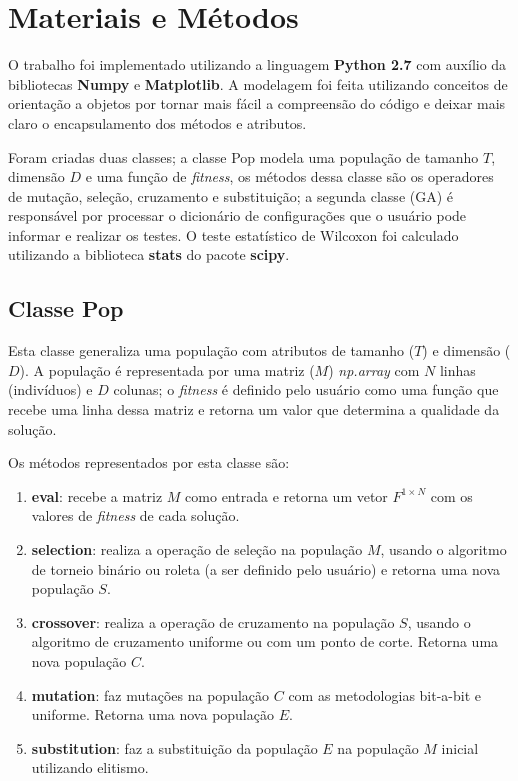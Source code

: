 \documentclass[11pt,a4paper]{article}
\begin{document}
\section{Materiais e Métodos}
O trabalho foi implementado utilizando a linguagem \textbf{Python 2.7} com auxílio da bibliotecas \textbf{Numpy} e \textbf{Matplotlib}. A modelagem foi feita utilizando conceitos de orientação a objetos por tornar mais fácil a compreensão do código e deixar mais claro o encapsulamento dos métodos e atributos.

Foram criadas duas classes; a classe Pop modela uma população de tamanho $T$, dimensão $D$ e uma função de \textit{fitness}, os métodos dessa classe são os operadores de mutação, seleção, cruzamento e substituição; a segunda classe (GA) é responsável por processar o dicionário de configurações que o usuário pode informar e realizar os testes. O teste estatístico de Wilcoxon foi calculado utilizando a biblioteca \textbf{stats} do pacote \textbf{scipy}.

\subsection{Classe Pop}
Esta classe generaliza uma população com atributos de tamanho ($T$) e dimensão ($D$). A população é representada por uma matriz ($M$) \textit{np.array} com $N$ linhas (indivíduos) e $D$ colunas; o \textit{fitness} é definido pelo usuário como uma função que recebe uma linha dessa matriz e retorna um valor que determina a qualidade da solução.

Os métodos representados por esta classe são:
\begin{enumerate}
	\item \textbf{eval}: recebe a matriz $M$ como entrada e retorna um vetor $F^{1\times N}$ com os valores de \textit{fitness} de cada solução.
	\item \textbf{selection}: realiza a operação de seleção na população $M$, usando o algoritmo de torneio binário ou roleta (a ser definido pelo usuário) e retorna uma nova população $S$.
	\item \textbf{crossover}: realiza a operação de cruzamento na população $S$, usando o algoritmo de cruzamento uniforme ou com um ponto de corte. Retorna uma nova população $C$.
	\item \textbf{mutation}: faz mutações na população $C$ com as metodologias bit-a-bit e uniforme. Retorna uma nova população $E$.
	\item \textbf{substitution}: faz a substituição da população $E$ na população $M$ inicial utilizando elitismo.
\end{enumerate}
\end{document}
